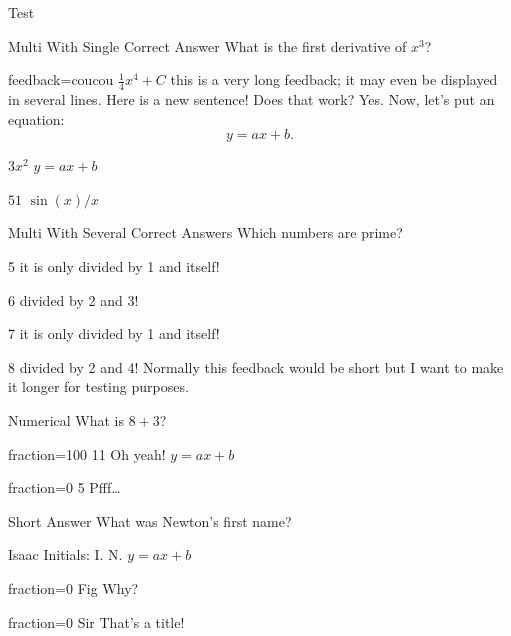 \documentclass{article}
\def\myequation{y=ax+b}
\begin{document}
\begin{quiz}[ %
	] {Test}

\begin{multi}[points=3]{Multi With Single Correct Answer} %
What is the first derivative of $x^3$?
\item[feedback={coucou}] $\frac{1}{4} x^4+C$ \feedback this is a very 
long feedback; it may even be displayed in several lines. Here is a new 
sentence! Does that work? Yes. Now, let's put an equation:
\[\myequation.\]
\item* $3x^2$ \feedback $\myequation$%
\item[] $51$ \feedback $\sin(x)/x$
\end{multi}

\begin{multi}[multiple]{Multi With Several Correct Answers} %
	Which numbers are prime?
	\item* 5 \feedback it is only divided by 1 and itself!
	\item 6 \feedback divided by 2 and 3!
	\item* 7 \feedback it is only divided by 1 and itself!
	\item 8 \feedback divided by 2 and 4! Normally this feedback would be short 
	but I want to make it longer for testing purposes.
\end{multi}


\begin{numerical}[ %
	] {Numerical}
What is $8+3$?
\item[fraction=100] 11 \feedback Oh yeah! $\myequation$
\item[fraction=0] 5 \feedback Pfff\dots
\end{numerical}

\begin{shortanswer}[case sensitive=true]{Short Answer}
What was Newton's first name?
\item Isaac \feedback Initials: I. N. $\myequation$
\item[fraction=0] Fig \feedback Why?
\item[fraction=0] Sir \feedback That's a title!
\end{shortanswer}


\end{quiz}
\end{document}
